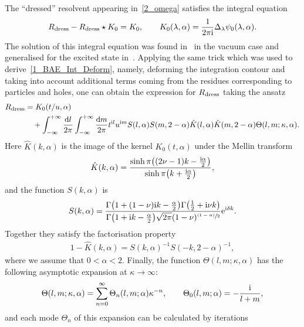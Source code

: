 \documentclass[pdftex]{sigma}
\numberwithin{equation}{section}
\begin{document}
The ``dressed'' resolvent appearing in~\eqref{2_omega} satisfies the integral equation
\begin{align*}%
R_{{\rm dress}}-R_{{\rm dress}}\star K_{0}=K_{0}, \qquad K_{0}(\lambda, \alpha)=\frac{1}{2\pi {\rm i}} \Delta_\lambda \psi_0(\lambda, \alpha).
\end{align*}
The solution of this integral equation was found in~\cite{HGS_4} in the vacuum case and generalised for the excited state in~\cite{Boos_TBAE}. Applying the same trick which was used to derive~\eqref{1_BAE_Int_Deform}, namely, deforming the integration contour and taking into account additional terms coming from the residues corresponding to particles and holes, one can obtain the expression for $R_{{\rm dress}}$ taking the ansatz
\begin{align}
R_{{\rm dress}} &= K_0(t/u, \alpha) \label{2_RDrees_Ansatz}\\
&\quad{}+\int_{-\infty}^{+\infty}\frac{{\rm d}l}{2\pi} \int_{-\infty}^{+\infty}\frac{{\rm d}m}{2\pi}
 t^{{\rm i}l} u^{{\rm i}m} S(l, \alpha) S(m, 2-\alpha) \hat{K}(l, \alpha) \hat{K}(m, 2-\alpha) \Theta(l, m; \kappa, \alpha).\nonumber
\end{align}
Here $\hat{K}(k, \alpha)$ is the image of the kernel $K_0(t, \alpha)$ under the Mellin transform
\begin{align*}
\hat{K}(k, \alpha)=\frac{\sinh\pi\bigl((2\nu-1)k-\frac{{\rm i}\alpha}{2}\bigr)}{\sinh\pi\bigl(k+\frac{{\rm i}\alpha}{2}\bigr)},
\end{align*}
and the function $S(k, \alpha)$ is
\begin{align*}
S(k, \alpha)=\frac{\Gamma\bigl(1+(1-\nu){\rm i}k-\frac{\alpha}{2}\bigr) \Gamma\bigl(\frac{1}{2}+{\rm i}\nu k\bigr)}{\Gamma\bigl(1+{\rm i}k-\frac{\alpha}{2}\bigr) \sqrt{2\pi} (1-\nu)^{\sfrac{(1-\alpha)}{2}}} {\rm e}^{{\rm i}\delta k}.
\end{align*}
Together they  satisfy the factorisation property
\begin{align*}
1-\hat{K}(k, \alpha)=S(k, \alpha)^{-1} S(-k, 2-\alpha)^{-1},
\end{align*}
where we assume that $0<\alpha<2$. Finally, the function $\Theta(l, m; \kappa, \alpha)$ has the following asymptotic expansion at $\kappa\rightarrow\infty$:
\begin{align*}%
\Theta(l, m; \kappa, \alpha) = \sum_{n=0}^{\infty} \Theta_n(l, m; \alpha) \kappa^{-n},
\qquad
\Theta_0(l, m; \alpha)=-\frac{{\rm i}}{l+m},
\end{align*}
and each mode $\Theta_n$ of this expansion can be calculated by iterations
\end{document}
